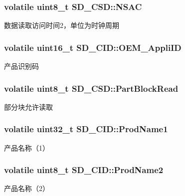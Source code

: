 \subsubsection[{\texorpdfstring{N\+S\+AC}{NSAC}}]{\setlength{\rightskip}{0pt plus 5cm}volatile uint8\+\_\+t S\+D\+\_\+\+C\+S\+D\+::\+N\+S\+AC}\hypertarget{group__sd__card_gaf243b37ec081b6ef479a3d2d50668543}{}\label{group__sd__card_gaf243b37ec081b6ef479a3d2d50668543}
数据读取访问时间2，单位为时钟周期 
\subsubsection[{\texorpdfstring{O\+E\+M\+\_\+\+Appli\+ID}{OEM_AppliID}}]{\setlength{\rightskip}{0pt plus 5cm}volatile uint16\+\_\+t S\+D\+\_\+\+C\+I\+D\+::\+O\+E\+M\+\_\+\+Appli\+ID}\hypertarget{group__sd__card_gae715248acd4c86ce3b821759bef6f1e1}{}\label{group__sd__card_gae715248acd4c86ce3b821759bef6f1e1}
产品识别码 
\subsubsection[{\texorpdfstring{Part\+Block\+Read}{PartBlockRead}}]{\setlength{\rightskip}{0pt plus 5cm}volatile uint8\+\_\+t S\+D\+\_\+\+C\+S\+D\+::\+Part\+Block\+Read}\hypertarget{group__sd__card_gad1480fb0cce305cbec05307b277fe9e6}{}\label{group__sd__card_gad1480fb0cce305cbec05307b277fe9e6}
部分块允许读取 
\subsubsection[{\texorpdfstring{Prod\+Name1}{ProdName1}}]{\setlength{\rightskip}{0pt plus 5cm}volatile uint32\+\_\+t S\+D\+\_\+\+C\+I\+D\+::\+Prod\+Name1}\hypertarget{group__sd__card_gab707dc163bd2cb8fc8d98643ea797585}{}\label{group__sd__card_gab707dc163bd2cb8fc8d98643ea797585}
产品名称（1） 
\subsubsection[{\texorpdfstring{Prod\+Name2}{ProdName2}}]{\setlength{\rightskip}{0pt plus 5cm}volatile uint8\+\_\+t S\+D\+\_\+\+C\+I\+D\+::\+Prod\+Name2}\hypertarget{group__sd__card_gaaa6e8c0191c67b8692c0dc8dfccff76d}{}\label{group__sd__card_gaaa6e8c0191c67b8692c0dc8dfccff76d}
产品名称（2） 
